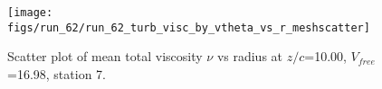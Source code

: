 \begin{figure}[H]
\centering
\texttt{[image: figs/run\_62/run\_62\_turb\_visc\_by\_vtheta\_vs\_r\_meshscatter]}
\caption{Scatter plot of mean total viscosity $\nu$ vs radius at $z/c$=10.00, $V_{free}$=16.98, station 7.}
\label{fig:run_62_turb_visc_by_vtheta_vs_r_meshscatter}
\end{figure}


